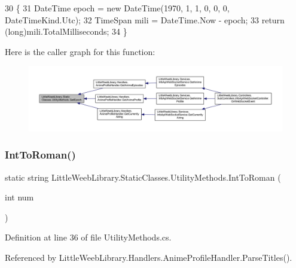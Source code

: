 \begin{DoxyCode}
30         \{
31             DateTime epoch = \textcolor{keyword}{new} DateTime(1970, 1, 1, 0, 0, 0, DateTimeKind.Utc);
32             TimeSpan mili = DateTime.Now - epoch;
33             \textcolor{keywordflow}{return} (\textcolor{keywordtype}{long})mili.TotalMilliseconds;
34         \}
\end{DoxyCode}
Here is the caller graph for this function\+:\nopagebreak
\begin{figure}[H]
\begin{center}
\leavevmode
\includegraphics[width=350pt]{class_little_weeb_library_1_1_static_classes_1_1_utility_methods_a12336d9e64983ddabaad8950486fafb2_icgraph}
\end{center}
\end{figure}
\mbox{\label{class_little_weeb_library_1_1_static_classes_1_1_utility_methods_ab54bc5e0856652f4554fda497af655b8}} 
\subsubsection{\texorpdfstring{Int\+To\+Roman()}{IntToRoman()}}
{\footnotesize\ttfamily static string Little\+Weeb\+Library.\+Static\+Classes.\+Utility\+Methods.\+Int\+To\+Roman (\begin{DoxyParamCaption}\item[{int}]{num }\end{DoxyParamCaption})\hspace{0.3cm}{\ttfamily [static]}}



Definition at line 36 of file Utility\+Methods.\+cs.



Referenced by Little\+Weeb\+Library.\+Handlers.\+Anime\+Profile\+Handler.\+Parse\+Titles().


